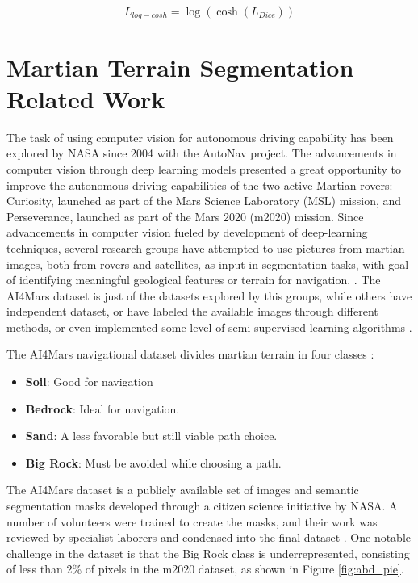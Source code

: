 \documentclass[10pt, conference]{IEEEtran}
\begin{document}
\begin{equation}
  L_{log-cosh} = \log(\cosh(L_{Dice})) 
  \label{eq:log_dice}
\end{equation}

\section{Martian Terrain Segmentation Related Work}

The task of using computer vision for autonomous driving capability has 
been explored by NASA since 2004 \cite{Swan2021} with the AutoNav project. 
The advancements in computer vision through deep learning models 
presented a great opportunity to improve the autonomous driving 
capabilities of the two active Martian rovers: Curiosity, launched as 
part of the Mars Science Laboratory (MSL) mission, and Perseverance, 
launched as part of the Mars 2020 (m2020) mission. Since advancements
in computer vision fueled by development of deep-learning techniques,
several research groups have attempted to use pictures from martian images,
both from rovers and satellites, as input in segmentation tasks, with goal of
identifying meaningful geological features or terrain for navigation.
\cite{Swan2021, Atha2022, Goutham2022, Luna2025}.
The AI4Mars dataset is just of the datasets explored by this groups, while
others have independent dataset, or have labeled the available images through
different methods, or even implemented some level of semi-supervised learning
algorithms \cite{Goutham2022}.

The AI4Mars navigational dataset divides martian terrain in four classes \cite{Swan2021} :
\begin{itemize}
\item \textbf{Soil}: Good for navigation
\item \textbf{Bedrock}: Ideal for navigation.  
\item \textbf{Sand}: A less favorable but still viable path choice.
\item \textbf{Big Rock}: Must be avoided while choosing a path.
\end{itemize}

The AI4Mars dataset is a publicly available set of images and semantic 
segmentation masks developed through a citizen science initiative by 
NASA. A number of volunteers were trained to create the masks, and 
their work was reviewed by specialist laborers and condensed into the 
final dataset \cite{Swan2021}. One notable challenge in the dataset is that the Big Rock class is 
underrepresented, consisting of less than 2\% of pixels in the m2020 
dataset, as shown in Figure \ref{fig:abd_pie}.
\end{document}
